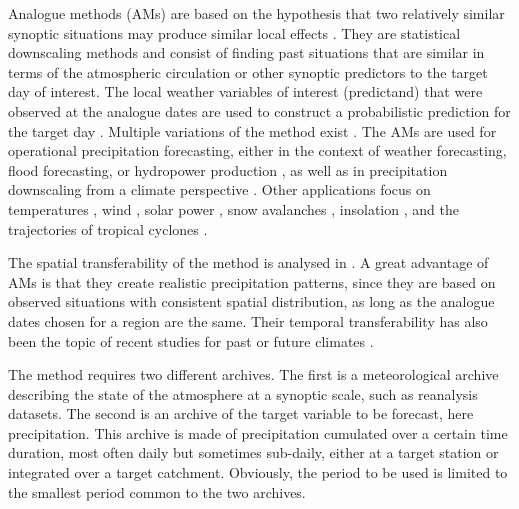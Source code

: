 \documentclass[hess, manuscript]{copernicus}
\begin{document}
	
	
	\introduction  %
	\label{sec:introduction}
	
	Analogue methods (AMs) are based on the hypothesis that two relatively similar synoptic situations may produce similar local effects \citep{Lorenz1956, Lorenz1969}. They are statistical downscaling methods \citep{Maraun2010} and consist of finding past situations that are similar in terms of the atmospheric circulation or other synoptic predictors to the target day of interest. The local weather variables of interest (predictand) that were observed at the analogue dates are used to construct a probabilistic prediction for the target day \citep{Duband1970, Zorita1999}. Multiple variations of the method exist \citep[a non-exhaustive listing can be found in][]{BenDaoud2016}. The AMs are used for operational precipitation forecasting, either in the context of weather forecasting, flood forecasting, or hydropower production \citep[e.g.,][]{Guilbaud1997, Bontron2005, Hamill2006, Desaint2008a, GarciaHernandez2009b, Bliefernicht2010, Marty2010, Marty2012, Horton2012, Obled2014, Hamill2015, BenDaoud2016}, as well as in precipitation downscaling from a climate perspective \citep[e.g.][]{Radanovics2013, Chardon2014, Dayon2015}. Other applications focus on temperatures \citep{Radinovic1975, Woodcock1980, Kruizinga1983, DelleMonache2013, Caillouet2016}, wind \citep{Gordon1987, DelleMonache2013, DelleMonache2011, Vanvyve2015, Alessandrini2015, Junk2015, Junk2015c}, solar power \citep{Alessandrini2015a, Bessa2015}, snow avalanches \citep{Obled1980, Bolognesi1993}, insolation \citep{Bois1981}, and the trajectories of tropical cyclones \citep{Keenan1981, Sievers2000, Fraedrich2003}.
	
	The spatial transferability of the method is analysed in \citet{Chardon2014}. A great advantage of AMs is that they create realistic precipitation patterns, since they are based on observed situations with consistent spatial distribution, as long as the analogue dates chosen for a region are the same. Their temporal transferability has also been the topic of recent studies for past or future climates \citep{Dayon2015, Caillouet2016}.
	
	The method requires two different archives. The first is a meteorological archive describing the state of the atmosphere at a synoptic scale, such as reanalysis datasets. The second is an archive of the target variable to be forecast, here precipitation. This archive is made of precipitation cumulated over a certain time duration, most often daily but sometimes sub-daily, either at a target station or integrated over a target catchment. Obviously, the period to be used is limited to the smallest period common to the two archives.
	
\end{document}
